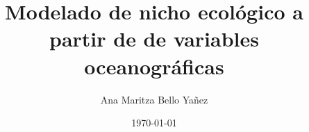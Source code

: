 \documentclass[12pt,letterpaper]{book}%
\begin{document}
\author{Ana Maritza Bello Yañez} 
\title{Modelado de nicho ecológico a partir de de variables oceanográficas} 
\date{\today} 







\mainmatter
\setcounter{chapter}{0}
\setcounter{page}{0}
\setcounter{secnumdepth}{4}





\backmatter 

\pagebreak
 

\end{document}
